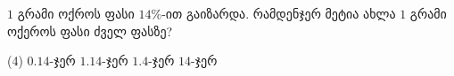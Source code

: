\(1\) გრამი ოქროს ფასი \(14\%\)-ით გაიზარდა. რამდენჯერ მეტია ახლა \(1\) გრამი ოქეროს ფასი ძველ ფასზე?

\vspace*{0.5cm}

\begin{tasks} (4)
    \task[ა)] \(0.14\)-ჯერ
    \task[ბ)] \(1.14\)-ჯერ
    \task[გ)]  \(1.4\)-ჯერ
    \task[დ)]   \(14\)-ჯერ
\end{tasks}